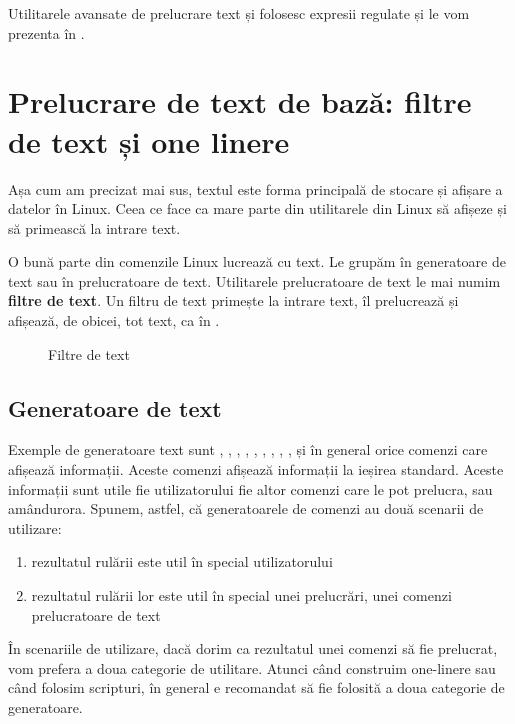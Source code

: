 Utilitarele avansate de prelucrare text  și  folosesc expresii regulate și
le vom prezenta în .

\section{Prelucrare de text de bază: filtre de text și one linere}
\label{sec:cli:basic-proc}

Așa cum am precizat mai sus, textul este forma principală de stocare și afișare
a datelor în Linux. Ceea ce face ca mare parte din utilitarele din Linux să
afișeze și să primească la intrare text.

O bună parte din comenzile Linux lucrează cu text. Le grupăm în generatoare de
text sau în prelucratoare de text. Utilitarele prelucratoare de text le mai
numim \textbf{filtre de text}. Un filtru de text primește la intrare text, îl prelucrează
și afișează, de obicei, tot text, ca în .

\begin{figure}[htbp]
  \centering
  \def\svgwidth{0.8\columnwidth}
  
  \caption{Filtre de text}
  \label{fig:cli:text-filters}
\end{figure}

\subsection{Generatoare de text}
\label{sec:cli:basic-proc:gen}

Exemple de generatoare text sunt , , , , , , , , ,  și în general orice comenzi care afișează informații. Aceste comenzi afișează informații la ieșirea standard. Aceste informații sunt utile fie utilizatorului fie altor comenzi care le pot prelucra, sau amândurora. Spunem, astfel, că generatoarele de comenzi au două scenarii de utilizare:

\begin{enumerate}
  \item rezultatul rulării este util în special utilizatorului
  \item rezultatul rulării lor este util în special unei prelucrări, unei comenzi prelucratoare de text
\end{enumerate}

În scenariile de utilizare, dacă dorim ca rezultatul unei comenzi să fie prelucrat, vom prefera a
doua categorie de utilitare. Atunci când construim one-linere sau când folosim
scripturi, în general e recomandat să fie folosită a doua categorie de
generatoare.

